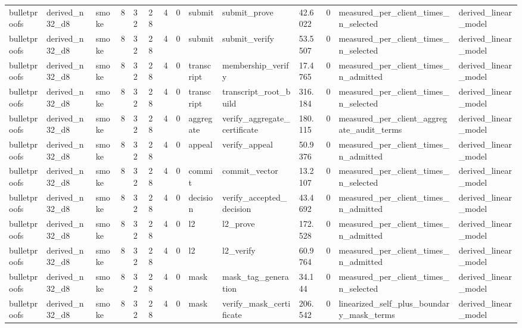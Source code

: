 \begin{table}[t]
\begin{tabular}{llllllllllllll}
bulletproofs & derived\_n32\_d8 & smoke & 8 & 32 & 28 & 4 & 0 & submit & submit\_prove & 42.6022 & 0 & measured\_per\_client\_times\_n\_selected & derived\_linear\_model \\
bulletproofs & derived\_n32\_d8 & smoke & 8 & 32 & 28 & 4 & 0 & submit & submit\_verify & 53.5507 & 0 & measured\_per\_client\_times\_n\_selected & derived\_linear\_model \\
bulletproofs & derived\_n32\_d8 & smoke & 8 & 32 & 28 & 4 & 0 & transcript & membership\_verify & 17.4765 & 0 & measured\_per\_client\_times\_n\_admitted & derived\_linear\_model \\
bulletproofs & derived\_n32\_d8 & smoke & 8 & 32 & 28 & 4 & 0 & transcript & transcript\_root\_build & 316.184 & 0 & measured\_per\_client\_times\_n\_selected & derived\_linear\_model \\
bulletproofs & derived\_n32\_d8 & smoke & 8 & 32 & 28 & 4 & 0 & aggregate & verify\_aggregate\_certificate & 180.115 & 0 & measured\_per\_client\_aggregate\_audit\_terms & derived\_linear\_model \\
bulletproofs & derived\_n32\_d8 & smoke & 8 & 32 & 28 & 4 & 0 & appeal & verify\_appeal & 50.9376 & 0 & measured\_per\_client\_times\_n\_admitted & derived\_linear\_model \\
bulletproofs & derived\_n32\_d8 & smoke & 8 & 32 & 28 & 4 & 0 & commit & commit\_vector & 13.2107 & 0 & measured\_per\_client\_times\_n\_selected & derived\_linear\_model \\
bulletproofs & derived\_n32\_d8 & smoke & 8 & 32 & 28 & 4 & 0 & decision & verify\_accepted\_decision & 43.4692 & 0 & measured\_per\_client\_times\_n\_admitted & derived\_linear\_model \\
bulletproofs & derived\_n32\_d8 & smoke & 8 & 32 & 28 & 4 & 0 & l2 & l2\_prove & 172.528 & 0 & measured\_per\_client\_times\_n\_admitted & derived\_linear\_model \\
bulletproofs & derived\_n32\_d8 & smoke & 8 & 32 & 28 & 4 & 0 & l2 & l2\_verify & 60.9764 & 0 & measured\_per\_client\_times\_n\_admitted & derived\_linear\_model \\
bulletproofs & derived\_n32\_d8 & smoke & 8 & 32 & 28 & 4 & 0 & mask & mask\_tag\_generation & 34.144 & 0 & measured\_per\_client\_times\_n\_selected & derived\_linear\_model \\
bulletproofs & derived\_n32\_d8 & smoke & 8 & 32 & 28 & 4 & 0 & mask & verify\_mask\_certificate & 206.542 & 0 & linearized\_self\_plus\_boundary\_mask\_terms & derived\_linear\_model \\

\end{tabular}
\end{table}
